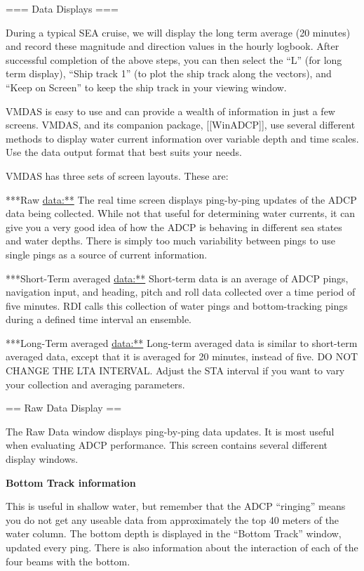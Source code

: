 \documentclass[]{book}
\theoremstyle{definition}
\theoremstyle{definition}
\theoremstyle{definition}
\theoremstyle{remark}
\begin{document}
=== Data Displays ===

During a typical SEA cruise, we will display the long term average (20
minutes) and record these magnitude and direction values in the hourly
logbook. After successful completion of the above steps, you can then
select the ``L'' (for long term display), ``Ship track 1'' (to plot the
ship track along the vectors), and ``Keep on Screen'' to keep the ship
track in your viewing window.

VMDAS is easy to use and can provide a wealth of information in just a
few screens. VMDAS, and its companion package, {[}{[}WinADCP{]}{]}, use
several different methods to display water current information over
variable depth and time scales. Use the data output format that best
suits your needs.

VMDAS has three sets of screen layouts. These are:

***Raw \url{data:**} The real time screen displays ping-by-ping updates
of the ADCP data being collected. While not that useful for determining
water currents, it can give you a very good idea of how the ADCP is
behaving in different sea states and water depths. There is simply too
much variability between pings to use single pings as a source of
current information.

***Short-Term averaged \url{data:**} Short-term data is an average of
ADCP pings, navigation input, and heading, pitch and roll data collected
over a time period of five minutes. RDI calls this collection of water
pings and bottom-tracking pings during a defined time interval an
ensemble.

***Long-Term averaged \url{data:**} Long-term averaged data is similar
to short-term averaged data, except that it is averaged for 20 minutes,
instead of five. DO NOT CHANGE THE LTA INTERVAL. Adjust the STA interval
if you want to vary your collection and averaging parameters.

== Raw Data Display ==

The Raw Data window displays ping-by-ping data updates. It is most
useful when evaluating ADCP performance. This screen contains several
different display windows.

\textbf{Bottom Track information}

This is useful in shallow water, but remember that the ADCP ``ringing''
means you do not get any useable data from approximately the top 40
meters of the water column. The bottom depth is displayed in the
``Bottom Track'' window, updated every ping. There is also information
about the interaction of each of the four beams with the bottom.
\end{document}

